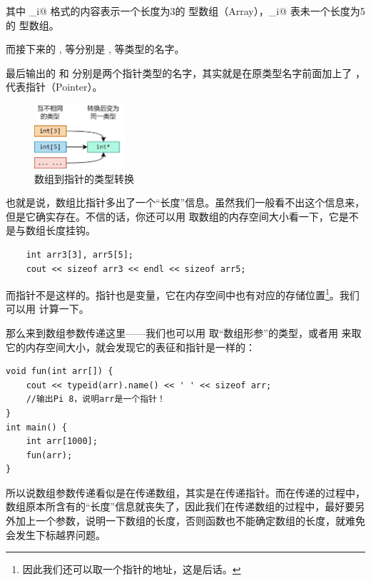 其中 _i@ 格式的内容表示一个长度为3的 \lstinline@int@ 型数组（Array），_i@ 表未一个长度为5的 \lstinline@int@ 型数组。\par
而接下来的 \lstinline@i@, \lstinline@d@ 等分别是 \lstinline@int@, \lstinline@double@ 等类型的名字。\par
最后输出的 \lstinline@Pi@ 和 \lstinline@Pc@ 分别是两个指针类型的名字，其实就是在原类型名字前面加上了 \lstinline@P@ ，代表指针（Pointer）。\par
\begin{figure}[htbp]
    \centering
    \includegraphics[width=0.3\textwidth]{../images/generalized_parts/05_array_to_pointer_conversion.drawio.png}
    \caption{数组到指针的类型转换}    
\end{figure}
也就是说，数组比指针多出了一个``长度''信息。虽然我们一般看不出这个信息来，但是它确实存在。不信的话，你还可以用 \lstinline@sizeof@ 取数组的内存空间大小看一下，它是不是与数组长度挂钩。
\begin{lstlisting}
    int arr3[3], arr5[5];
    cout << sizeof arr3 << endl << sizeof arr5;
\end{lstlisting}
而指针不是这样的。指针也是变量，它在内存空间中也有对应的存储位置\footnote{因此我们还可以取一个指针的地址，这是后话。}。我们可以用 \lstinline@sizeof@ 计算一下。\par
那么来到数组参数传递这里——我们也可以用 \lstinline@typeid@ 取``数组形参''的类型，或者用 \lstinline@sizeof@ 来取它的内存空间大小，就会发现它的表征和指针是一样的：
\begin{lstlisting}
void fun(int arr[]) {
    cout << typeid(arr).name() << ' ' << sizeof arr;
    //输出Pi 8，说明arr是一个指针！
}
int main() {
    int arr[1000];
    fun(arr);
}
\end{lstlisting}\par
所以说数组参数传递看似是在传递数组，其实是在传递指针。而在传递的过程中，数组原本所含有的``长度''信息就丧失了，因此我们在传递数组的过程中，最好要另外加上一个参数，说明一下数组的长度，否则函数也不能确定数组的长度，就难免会发生下标越界问题。\par
